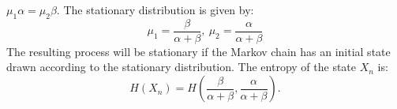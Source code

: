 \documentclass[10pt,twocolumn,letterpaper]{article}
\begin{document}
\begin{math}
      \mu_1\alpha = \mu_2\beta.
\end{math} The stationary distribution is given by:
\begin{equation*}
    \mu_1 = \frac{\beta}{\alpha + \beta}, \: \mu_2 = \frac{\alpha}{\alpha + \beta}
\end{equation*} 
The resulting process will be stationary if the Markov chain has an initial state drawn according to the stationary distribution. The entropy of the state \begin{math} X_n
\end{math} is: \\
\begin{equation*}
    H(X_n) = H( \frac{\beta}{\alpha + \beta}, \frac{\alpha}{\alpha + \beta} ).
\end{equation*}\\
\end{document}
